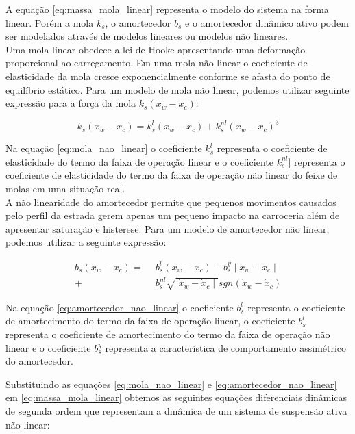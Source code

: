 \documentclass[a4paper]{ifacconf}
\begin{document}
    A equação \ref{eq:massa_mola_linear} representa o modelo do sistema na forma linear. Porém a mola $k_s$, o amortecedor $b_s$ e o amortecedor dinâmico ativo podem ser modelados através de modelos lineares ou modelos não lineares. \\
    Uma mola linear obedece a lei de Hooke apresentando uma deformação proporcional ao carregamento. Em uma mola não linear o coeficiente de elasticidade da mola cresce exponencialmente conforme se afasta do ponto de equilíbrio estático.
    Para um modelo de mola não linear, podemos utilizar seguinte expressão para a força da mola $ k_{s}(x_{w}-x_{c})$:
    
    \begin{equation} \label{eq:mola_nao_linear}
        k_{s}(x_{w}-x_{c}) = k^{l}_{s}(x_{w}-x_{c})+k^{nl}_{s}(x_{w}-x_{c})^{3}
    \end{equation}
        
    Na equação \ref{eq:mola_nao_linear} o coeficiente $k^{l}_{s}$ representa o coeficiente de elasticidade do termo da faixa de operação linear e o coeficiente $k^{nl}_{s}$] representa o coeficiente de elasticidade do termo da faixa de operação não linear do feixe de molas em uma situação real.\\
    A não linearidade do amortecedor permite que pequenos movimentos causados pelo perfil da estrada gerem apenas um pequeno impacto na carroceria além de apresentar saturação e histerese. Para um modelo de amortecedor não linear, podemos utilizar a seguinte expressão:
 
    \begin{equation} \label{eq:amortecedor_nao_linear}
        \begin{aligned}
        b_{s}(\dot{x}_{w}-\dot{x}_{c}) =\ \ &b^{l}_{s}(\dot{x}_{w}-\dot{x}_{c}) - b^{y}_{s}\mid\dot{x}_{w}-\dot{x}_{c}\mid \\
        + &b^{nl}_{s}\sqrt{\mid\dot{x}_{w}-\dot{x}_{c}\mid}sgn(\dot{x}_{w}-\dot{x}_{c})  
        \end{aligned}
    \end{equation}
    
    Na equação \ref{eq:amortecedor_nao_linear} o coeficiente $b^{l}_{s}$ representa o coeficiente de amortecimento do termo da faixa de operação linear, o coeficiente $b^{l}_{s}$ representa o coeficiente de amortecimento do termo da faixa de operação não linear e o coeficiente $b^{y}_{s}$ representa a característica de comportamento assimétrico do amortecedor.
    
    Substituindo as equações \ref{eq:mola_nao_linear} e \ref{eq:amortecedor_nao_linear} em \ref{eq:massa_mola_linear} obtemos as seguintes equações diferenciais dinâmicas de segunda ordem que representam a dinâmica de um sistema de suspensão ativa não linear:
    
\end{document}
